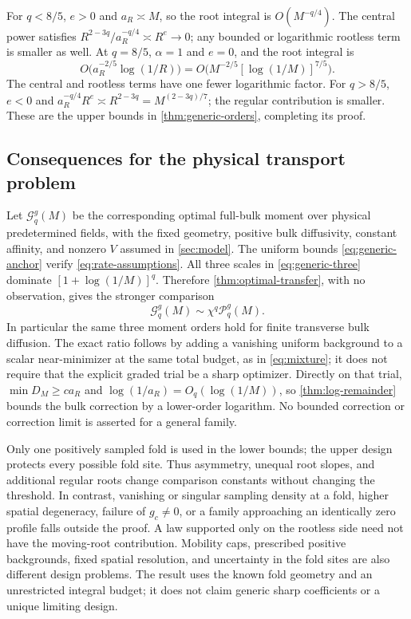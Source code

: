 For $q<8/5$, $e>0$ and $a_R\asymp M$, so the root integral is
$O(M^{-q/4})$. The central power satisfies
$R^{2-3q}/a_R^{-q/4}\asymp R^e\to0$; any bounded or logarithmic
rootless term is smaller as well. At $q=8/5$, $\alpha=1$ and $e=0$,
and the root integral is
\[
 O\bigl(a_R^{-2/5}\log(1/R)\bigr)
 =O\bigl(M^{-2/5}[\log(1/M)]^{7/5}\bigr).
\]
The central and rootless terms have one fewer logarithmic factor.
For $q>8/5$, $e<0$ and
$a_R^{-q/4}R^e\asymp R^{2-3q}=M^{(2-3q)/7}$;
the regular contribution is smaller. These are the upper bounds in
\cref{thm:generic-orders}, completing its proof.

\subsection{Consequences for the physical transport problem}
Let $\mathcal G_q^g(M)$ be the corresponding optimal full-bulk moment
over physical predetermined fields, with the fixed geometry, positive
bulk diffusivity, constant affinity, and nonzero $V$ assumed in
\cref{sec:model}. The uniform bounds \eqref{eq:generic-anchor} verify
\eqref{eq:rate-assumptions}. All three scales in
\eqref{eq:generic-three} dominate $[1+\log(1/M)]^q$. Therefore
\cref{thm:optimal-transfer}, with no observation, gives the stronger
comparison
\begin{equation}\label{eq:generic-bulk}
 \mathcal G_q^g(M)\sim\chi^q\mathcal P_q^g(M).
\end{equation}
In particular the same three moment orders hold for finite transverse
bulk diffusion. The exact ratio follows by adding a vanishing uniform
background to a scalar near-minimizer at the same total budget, as
in \eqref{eq:mixture}; it does not require that the explicit graded
trial be a sharp optimizer. Directly on that trial,
$\min D_M\ge ca_R$ and
$\log(1/a_R)=O_q(\log(1/M))$, so \cref{thm:log-remainder} bounds
the bulk correction by a lower-order logarithm. No bounded correction
or correction limit is asserted for a general family.

Only one positively sampled fold is used in the lower bounds; the
upper design protects every possible fold site. Thus asymmetry, unequal
root slopes, and additional regular roots change comparison constants
without changing the threshold. In contrast, vanishing or singular
sampling density at a fold, higher spatial degeneracy, failure of
$g_c\ne0$, or a family approaching an identically zero profile falls
outside the proof. A law supported only on the rootless side need not
have the moving-root contribution. Mobility caps, prescribed positive
backgrounds, fixed spatial resolution, and uncertainty in the fold
sites are also different design problems. The result uses the known
fold geometry and an unrestricted integral budget; it does not claim
generic sharp coefficients or a unique limiting design.
